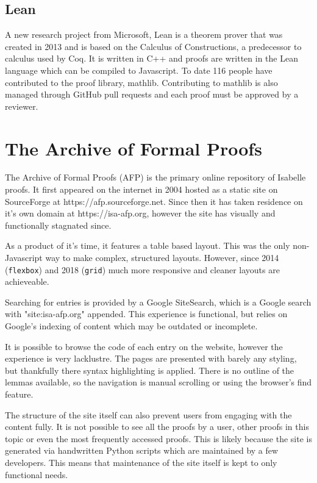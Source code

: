 \documentclass[frontabs,bsc,singlespacing,parskip,deptreport]{infthesis}
\begin{document}
\subsection{Lean}

A new research project from Microsoft, Lean is a theorem prover that was created in 2013 and is based on the Calculus of Constructions, a predecessor to calculus used by Coq. It is written in C++ and proofs are written in the Lean language which can be compiled to Javascript. To date 116 people have contributed to the proof library, mathlib. Contributing to mathlib is also managed through GitHub pull requests and each proof must be approved by a reviewer.

\section{The Archive of Formal Proofs}

The Archive of Formal Proofs (AFP) is the primary online repository of Isabelle proofs. It first appeared on the internet in 2004 hosted as a static site on SourceForge at https://afp.sourceforge.net. Since then it has taken residence on it's own domain at https://isa-afp.org, however the site has visually and functionally stagnated since.

As a product of it's time, it features a table based layout. This was the only non-Javascript way to make complex, structured layouts. However, since 2014 (\verb|flexbox|) and 2018 (\verb|grid|) much more responsive and cleaner layouts are achieveable.

Searching for entries is provided by a Google SiteSearch, which is a Google search with "site:isa-afp.org" appended. This experience is functional, but relies on Google's indexing of content which may be outdated or incomplete. 

It is possible to browse the code of each entry on the website, however the experience is very lacklustre. The pages are presented with barely any styling, but thankfully there syntax highlighting is applied. There is no outline of the lemmas available, so the navigation is manual scrolling or using the browser's find feature.

The structure of the site itself can also prevent users from engaging with the content fully. It is not possible to see all the proofs by a user, other proofs in this topic or even the most frequently accessed proofs. This is likely because the site is generated via handwritten Python scripts which are maintained by a few developers. This means that maintenance of the site itself is kept to only functional needs. 
\end{document}
